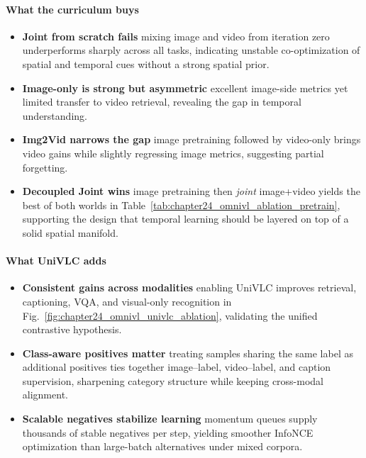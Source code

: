 \begin{enrichment}
\begin{enrichment}
        \paragraph{What the curriculum buys}
        \begin{itemize}
            \item \textbf{Joint from scratch fails} mixing image and video from iteration zero underperforms sharply across all tasks, indicating unstable co-optimization of spatial and temporal cues without a strong spatial prior.
            \item \textbf{Image-only is strong but asymmetric} excellent image-side metrics yet limited transfer to video retrieval, revealing the gap in temporal understanding.
            \item \textbf{Img2Vid narrows the gap} image pretraining followed by video-only brings video gains while slightly regressing image metrics, suggesting partial forgetting.
            \item \textbf{Decoupled Joint wins} image pretraining then \emph{joint} image+video yields the best of both worlds in Table~\ref{tab:chapter24_omnivl_ablation_pretrain}, supporting the design that temporal learning should be layered on top of a solid spatial manifold.
        \end{itemize}
        
        \paragraph{What UniVLC adds}
        \begin{itemize}
            \item \textbf{Consistent gains across modalities} enabling UniVLC improves retrieval, captioning, VQA, and visual-only recognition in Fig.~\ref{fig:chapter24_omnivl_univlc_ablation}, validating the unified contrastive hypothesis.
            \item \textbf{Class-aware positives matter} treating samples sharing the same label as additional positives ties together image–label, video–label, and caption supervision, sharpening category structure while keeping cross-modal alignment.
            \item \textbf{Scalable negatives stabilize learning} momentum queues supply thousands of stable negatives per step, yielding smoother InfoNCE optimization than large-batch alternatives under mixed corpora.
        \end{itemize}
        

\end{enrichment}
\end{enrichment}
